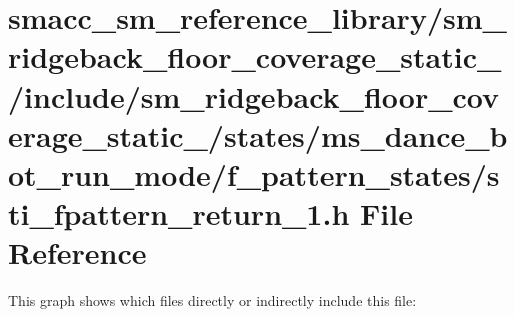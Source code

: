 \hypertarget{sm__ridgeback__floor__coverage__static__1_2include_2sm__ridgeback__floor__coverage__static__1_2sc903a82c8c794a5ead34180ca2e3d232}{}\section{smacc\+\_\+sm\+\_\+reference\+\_\+library/sm\+\_\+ridgeback\+\_\+floor\+\_\+coverage\+\_\+static\+\_/include/sm\+\_\+ridgeback\+\_\+floor\+\_\+coverage\+\_\+static\+\_/states/ms\+\_\+dance\+\_\+bot\+\_\+run\+\_\+mode/f\+\_\+pattern\+\_\+states/sti\+\_\+fpattern\+\_\+return\+\_\+1.h File Reference}
\label{sm__ridgeback__floor__coverage__static__1_2include_2sm__ridgeback__floor__coverage__static__1_2sc903a82c8c794a5ead34180ca2e3d232}
This graph shows which files directly or indirectly include this file\+:
\nopagebreak
